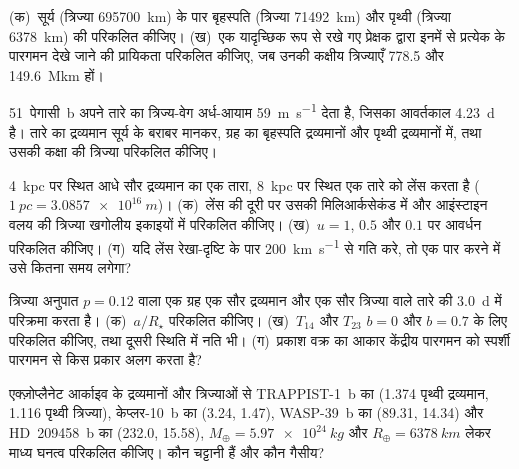\begin{exercise}[$\star$]\label{exo:b3:exoplanets:2}
(क)~सूर्य (त्रिज्या \qty{695700}{km}) के पार बृहस्पति (त्रिज्या \qty{71492}{km})
और पृथ्वी (त्रिज्या \qty{6378}{km}) की  परिकलित कीजिए। (ख)~एक
यादृच्छिक रूप से रखे गए प्रेक्षक द्वारा इनमें से प्रत्येक के पारगमन देखे जाने की
प्रायिकता परिकलित कीजिए, जब उनकी कक्षीय त्रिज्याएँ \num{778.5}
और \qty{149.6}{\mega km} हों।
\end{exercise}

\begin{exercise}[$\star$]\label{exo:b3:exoplanets:3}
51~पेगासी~b अपने तारे का त्रिज्य-वेग अर्ध-आयाम
\qty{59}{m.s^{-1}} देता है, जिसका आवर्तकाल \qty{4.23}{d} है। तारे का द्रव्यमान
सूर्य के बराबर मानकर, ग्रह का  बृहस्पति द्रव्यमानों
और पृथ्वी द्रव्यमानों में, तथा उसकी कक्षा की त्रिज्या परिकलित कीजिए।
\end{exercise}

\begin{exercise}[$\star$]\label{exo:b3:exoplanets:4}
\qty{4}{kpc} पर स्थित आधे सौर द्रव्यमान का एक तारा, \qty{8}{kpc} पर
स्थित एक तारे को लेंस करता है ($\qty{1}{pc} = \qty{3.0857e16}{m}$)। (क)~लेंस की दूरी पर उसकी
 मिलिआर्कसेकंड में और आइंस्टाइन वलय की त्रिज्या खगोलीय इकाइयों में
परिकलित कीजिए। (ख)~$u = 1$, $0.5$ और $0.1$ पर आवर्धन परिकलित कीजिए।
(ग)~यदि लेंस रेखा-दृष्टि के पार
\qty{200}{km.s^{-1}} से गति करे, तो एक  पार करने में
उसे कितना समय लगेगा?
\end{exercise}

\begin{exercise}[$\star\star$]\label{exo:b3:exoplanets:5}
त्रिज्या अनुपात $p = 0.12$ वाला एक ग्रह एक सौर द्रव्यमान और एक सौर त्रिज्या वाले
तारे की \qty{3.0}{d} में परिक्रमा करता है। (क)~$a/R_\star$ परिकलित कीजिए। (ख)~$T_{14}$ और $T_{23}$
$b = 0$ और $b = 0.7$ के लिए परिकलित कीजिए, तथा दूसरी स्थिति में नति भी।
(ग)~प्रकाश वक्र का आकार केंद्रीय पारगमन को
स्पर्शी पारगमन से किस प्रकार अलग करता है?
\end{exercise}

\begin{exercise}[$\star\star$]\label{exo:b3:exoplanets:6}
एक्ज़ोप्लैनेट आर्काइव के द्रव्यमानों और त्रिज्याओं से TRAPPIST-1~b का (1.374 पृथ्वी
द्रव्यमान, 1.116 पृथ्वी त्रिज्या), केप्लर-10~b का (3.24, 1.47), WASP-39~b का
(89.31, 14.34) और HD~209458~b का (232.0,
15.58), $M_\oplus = \qty{5.97e24}{kg}$ और $R_\oplus =
\qty{6378}{km}$ लेकर माध्य घनत्व परिकलित कीजिए। कौन चट्टानी हैं और कौन गैसीय?
\end{exercise}


